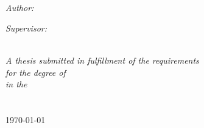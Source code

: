 \documentclass[
10pt, %
oneside, %
chapterinoneline,%
english, %
singlespacing, %
liststotoc, %
toctotoc, %
parskip, %
headsepline, %
]{MastersDoctoralThesis} %
\author{Yang \textsc{Jiang}} %
\begin{document}
\frontmatter %
\pagestyle{plain} %

\begin{titlepage}
\begin{center}
{\scshape\LARGE \univname\par}\vspace{1.5cm} %

\HRule \\[0.4cm] %
{\huge \bfseries \ttitle\par}\vspace{0.4cm} %
\HRule \\[1.5cm] %
 
\begin{minipage}[t]{0.4\textwidth}
\begin{flushleft} \large
\emph{Author:}\\
{\authorname} %
\end{flushleft}
\end{minipage}

\begin{minipage}[t]{0.4\textwidth}
\begin{flushright} \large
\emph{Supervisor:} \\
\href{http://www.massey.ac.nz/massey/expertise/profile.cfm?stref=359402}{\supname} %
\end{flushright}
\end{minipage}\\[3cm]
 
\large \textit{A thesis submitted in fulfillment of the requirements\\ for the degree of \degreename}\\[0.3cm] %
\textit{in the}\\[0.4cm]
\majorname\\\papername\\[2cm]
 
{\large \today}\\[4cm] %
 
\vfill
\end{center}
\end{titlepage}
\end{document}
